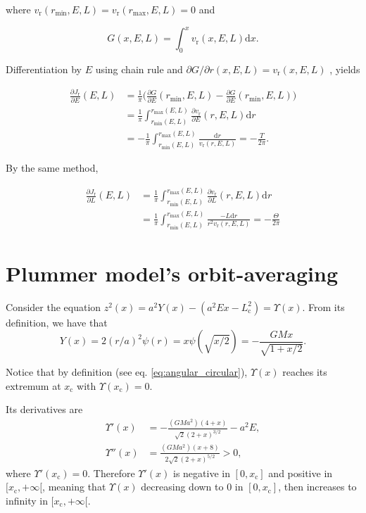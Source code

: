 \documentclass[11pt]{article}
\newcommand{\rr}{\mathrm{r}}
\newcommand{\rc}{\mathrm{c}}
\newcommand{\rd}{{\mathrm{d}}}
\newcommand{\vr}{v_{\rr}}
\newcommand{\Lc}{L_{\rc}}
\newcommand{\Jr}{J_{\rr}}
\newcommand{\rmax}{r_{\max}}
\newcommand{\rmin}{r_{\min}}
\newcommand{\xc}{x_{\rc}}
\begin{document}
\begin{appendices}
where $\vr(\rmin,E,L)=\vr(\rmax,E,L)=0$ and

\begin{equation}
  G(x,E,L) = \int_{0}^{x} \vr(x,E,L) \rd x .
  \label{eq:Jr_eq_G}
\end{equation}

Differentiation by $E$ using chain rule and $\partial G/\partial r (x,E,L) = \vr(x,E,L)$ , yields

\begin{align*}
  \frac{\partial \Jr}{\partial E}(E,L) &= \frac{1}{\pi} \bigg( \frac{\partial G}{\partial E}(\rmin,E,L)- \frac{\partial G}{\partial E}(\rmin,E,L)\bigg)
  \label{eq:dJrdE} \\
  &= \frac{1}{\pi} \int_{\rmin(E,L)}^{\rmax(E,L)} \frac{\partial \vr}{\partial E} (r,E,L) \rd r \\
  &= - \frac{1}{\pi} \int_{\rmin(E,L)}^{\rmax(E,L)} \frac{\rd r}{\vr(r,E,L)} = -\frac{T}{2\pi} .
\end{align*}

By the same method,

\begin{align*}
  \frac{\partial \Jr}{\partial L}(E,L) &= \frac{1}{\pi} \int_{\rmin(E,L)}^{\rmax(E,L)} \frac{\partial \vr}{\partial L} (r,E,L) \rd r \\
  &= \frac{1}{\pi} \int_{\rmin(E,L)}^{\rmax(E,L)} \frac{- L \rd r }{r^{2} \vr(r,E,L)} = - \frac{\Theta}{2\pi}
\end{align*}

\section{Plummer model's orbit-averaging}
\label{sec:OrbAvrPlummer}

Consider the equation $z^{2}(x)=a^{2}Y(x)-(a^{2}Ex-\Lc^{2})=\Upsilon(x)$. From its definition, we have that
\begin{equation}
  Y(x) = 2(r/a)^{2}\psi(r) = x \psi(\sqrt{x/2}) = - \frac{GMx}{\sqrt{1+x/2}} .
  \label{eq:Y(x)_Plummer}
\end{equation}

Notice that by definition (see eq. \eqref{eq:angular_circular}), $\Upsilon(x)$ reaches its extremum at $\xc$ with $\Upsilon(\xc)=0$.

Its derivatives are
\begin{align*}
  \Upsilon'(x)&=-\frac{(GMa^{2})(4+x)}{\sqrt{2}(2+x)^{3/2}}-a^{2}E,\\
  \Upsilon''(x)&= \frac{(GMa^{2})(x+8)}{2\sqrt{2}(2+x)^{5/2}}>0, 
\end{align*}
where $\Upsilon'(\xc)=0$. Therefore $\Upsilon'(x)$ is negative in $[0,\xc]$ and positive in $[\xc,+\infty[$, meaning that $\Upsilon(x)$ decreasing down to $0$ in $[0,\xc]$, then increases to infinity in $[\xc,+\infty[$.


\end{appendices}
\end{document}
